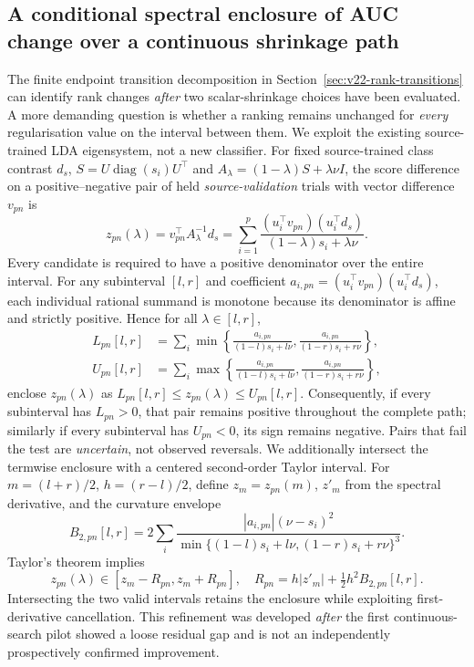 \subsection{A conditional spectral enclosure of AUC change over a continuous shrinkage path}
\label{sec:v23-spectral-continuum}
The finite endpoint transition decomposition in
Section~\ref{sec:v22-rank-transitions} can identify rank changes
\emph{after} two scalar-shrinkage choices have been evaluated.
A more demanding question is whether a ranking remains unchanged for
\emph{every} regularisation value on the interval between them.
We exploit the existing source-trained LDA eigensystem, not a
new classifier. For fixed source-trained class contrast $d_s$,
$S=U\operatorname{diag}(s_i)U^\top$ and
$A_\lambda=(1-\lambda)S+\lambda\nu I$,
the score difference on a positive--negative pair of held
\emph{source-validation} trials with vector difference $v_{pn}$ is
\begin{equation}
 z_{pn}(\lambda)=v_{pn}^\top A_\lambda^{-1}d_s
 =\sum_{i=1}^p\frac{(u_i^\top v_{pn})(u_i^\top d_s)}
 {(1-\lambda)s_i+\lambda\nu}.
 \label{eq:v23-spectral-path}
\end{equation}
Every candidate is required to have a positive denominator over the
entire interval. For any subinterval $[l,r]$ and coefficient
$a_{i,pn}=(u_i^\top v_{pn})(u_i^\top d_s)$, each individual rational
summand is monotone because its denominator is affine and strictly
positive. Hence for all $\lambda\in[l,r]$,
\begin{align}
 L_{pn}[l,r]&=\sum_i\min\left\{
 \frac{a_{i,pn}}{(1-l)s_i+l\nu},
 \frac{a_{i,pn}}{(1-r)s_i+r\nu}\right\},\nonumber\\
 U_{pn}[l,r]&=\sum_i\max\left\{
 \frac{a_{i,pn}}{(1-l)s_i+l\nu},
 \frac{a_{i,pn}}{(1-r)s_i+r\nu}\right\},
 \label{eq:v23-interval}
\end{align}
enclose $z_{pn}(\lambda)$ as
$L_{pn}[l,r]\le z_{pn}(\lambda)\le U_{pn}[l,r]$.
Consequently, if every subinterval has $L_{pn}>0$, that pair
remains positive throughout the complete path; similarly if
every subinterval has $U_{pn}<0$, its sign remains negative.
Pairs that fail the test are \emph{uncertain}, not observed
reversals. We additionally intersect the termwise enclosure
with a centered second-order Taylor interval.
For $m=(l+r)/2$, $h=(r-l)/2$, define
$z_m=z_{pn}(m)$, $z'_m$ from the spectral derivative,
and the curvature envelope
\[
 B_{2,pn}[l,r]=
 2\sum_i\frac{|a_{i,pn}|(\nu-s_i)^2}
 {\min\{(1-l)s_i+l\nu,(1-r)s_i+r\nu\}^{3}}.
\]
Taylor's theorem implies
\[
 z_{pn}(\lambda)\in
 [z_m-R_{pn},z_m+R_{pn}],\quad
 R_{pn}=h|z'_m|+\tfrac12h^2B_{2,pn}[l,r].
\]
Intersecting the two valid intervals retains the enclosure
while exploiting first-derivative cancellation. This refinement
was developed \emph{after} the first continuous-search pilot
showed a loose residual gap and is not an independently
prospectively confirmed improvement.

